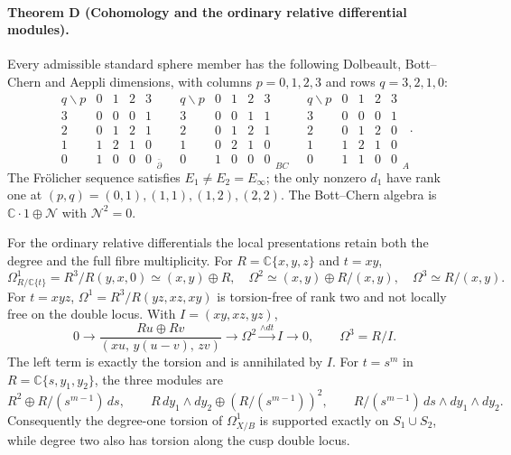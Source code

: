 \documentclass[11pt,a4paper]{article}
\theoremstyle{definition}
\newcommand{\C}{\mathbb C}\newcommand{\R}{\mathbb R}\newcommand{\Z}{\mathbb Z}\newcommand{\Q}{\mathbb Q}\newcommand{\N}{\mathbb N}\newcommand{\F}{\mathbb F}
\begin{document}
\paragraph{Theorem D (Cohomology and the ordinary relative differential modules).}
\label{series:I:D}
Every admissible standard sphere member has the following
Dolbeault, Bott--Chern and Aeppli dimensions, with columns
$p=0,1,2,3$ and rows $q=3,2,1,0$:
\[
\begin{array}{c|rrrr}q\backslash p&0&1&2&3\\\hline
3&0&0&0&1\\2&0&1&2&1\\1&1&2&1&0\\0&1&0&0&0
\end{array}_{\bar\partial}\quad
\begin{array}{c|rrrr}q\backslash p&0&1&2&3\\\hline
3&0&0&1&1\\2&0&1&2&1\\1&0&2&1&0\\0&1&0&0&0
\end{array}_{BC}\quad
\begin{array}{c|rrrr}q\backslash p&0&1&2&3\\\hline
3&0&0&0&1\\2&0&1&2&0\\1&1&2&1&0\\0&1&1&0&0
\end{array}_{A}.
\]
The Fr\"olicher sequence satisfies $E_1\ne E_2=E_\infty$;
the only nonzero $d_1$ have rank one at
$(p,q)=(0,1),(1,1),(1,2),(2,2)$.  The Bott--Chern algebra is
$\C\cdot1\oplus\mathcal N$ with $\mathcal N^2=0$.

For the ordinary relative differentials the local presentations
retain both the degree and the full fibre multiplicity.  For
$R=\C\{x,y,z\}$ and $t=xy$,
\[
 \Omega^1_{R/\C\{t\}}=R^3/R(y,x,0)\simeq(x,y)\oplus R,
 \quad\Omega^2\simeq(x,y)\oplus R/(x,y),
 \quad\Omega^3\simeq R/(x,y).
\]
For $t=xyz$, $\Omega^1=R^3/R(yz,xz,xy)$ is torsion-free of
rank two and not locally free on the double locus.  With
$I=(xy,xz,yz)$,
\[
 0\longrightarrow
 \frac{Ru\oplus Rv}{(xu,\,y(u-v),\,zv)}
 \longrightarrow\Omega^2\xrightarrow{\wedge dt}I
 \longrightarrow0,
 \qquad \Omega^3=R/I.
\]
The left term is exactly the torsion and is annihilated by $I$.
For $t=s^m$ in $R=\C\{s,y_1,y_2\}$, the three modules are
\[
 R^2\oplus R/(s^{m-1})\,ds,\qquad
 R\,dy_1\wedge dy_2\oplus(R/(s^{m-1}))^2,
 \qquad R/(s^{m-1})\,ds\wedge dy_1\wedge dy_2.
\]
Consequently the degree-one torsion of $\Omega^1_{X/B}$ is
supported exactly on $S_1\cup S_2$, while degree two also has
torsion along the cusp double locus.
\end{document}
